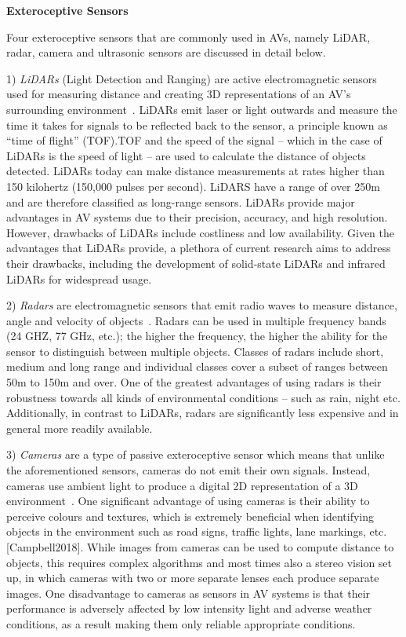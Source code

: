 \documentclass{article}
\begin{document}
\textbf{Exteroceptive Sensors}

Four exteroceptive sensors that are commonly used in AVs, namely LiDAR, radar, camera and ultrasonic sensors are discussed in detail below.

1) \emph{LiDARs} (Light Detection and Ranging) are active electromagnetic sensors used for measuring distance and creating 3D representations of an AV’s surrounding environment~\cite{Campbell2018}. LiDARs emit laser or light outwards and measure the time it takes for signals to be reflected back to the sensor, a principle known as “time of flight” (TOF).TOF and the speed of the signal -- which in the case of LiDARs is the speed of light -- are used to calculate the distance of objects detected. LiDARs today can make distance measurements at rates higher than 150 kilohertz (150,000 pulses per second). LiDARS have a range of over 250m and are therefore classified as  long-range sensors. LiDARs provide major advantages in AV systems due to their  precision, accuracy, and high resolution. However, drawbacks of LiDARs include costliness and low availability. Given the advantages that LiDARs provide, a plethora of current research aims to address their drawbacks, including the development of solid-state LiDARs and infrared LiDARs for widespread usage.

2) \emph{Radars} are electromagnetic sensors that emit radio waves to measure distance, angle and velocity of objects~\cite{Campbell2018}. Radars can be used in multiple frequency bands (24 GHZ, 77 GHz, etc.); the higher the frequency, the higher the ability for the sensor to distinguish between multiple objects. Classes of radars include short, medium and long range and individual classes cover a subset of ranges between 50m to 150m and over. One of the greatest advantages of using radars is their robustness towards all kinds of environmental conditions -- such as rain, night etc. Additionally, in contrast to LiDARs, radars are significantly less expensive and in general more readily available.

3) \emph{Cameras} are a type of passive exteroceptive sensor which means that unlike the aforementioned sensors, cameras do not emit their own signals. Instead, cameras  use ambient light to produce a digital 2D representation of a 3D environment~\cite{RMLAV}. One significant advantage of using cameras is their ability to perceive colours and textures, which is extremely beneficial when identifying objects in the environment such as road signs, traffic lights, lane markings, etc.[Campbell2018]. While images from cameras can be used to compute distance to objects, this requires complex algorithms and most times also a stereo vision set up, in which cameras with two or more separate lenses each produce separate images. One disadvantage to cameras as sensors in AV systems is that their performance is adversely affected by low intensity light and adverse weather conditions, as a result making them only reliable appropriate conditions.
\end{document}
